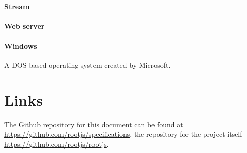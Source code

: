 \paragraph{Stream}

\paragraph{Web server}

\paragraph{Windows}
A DOS based operating system created by Microsoft.

\section{Links}

The Github repository for this document can be found at  \href{here}{https://github.com/rootjs/specifications}, the repository for the project itself \href{here}{https://github.com/rootjs/rootjs}.
